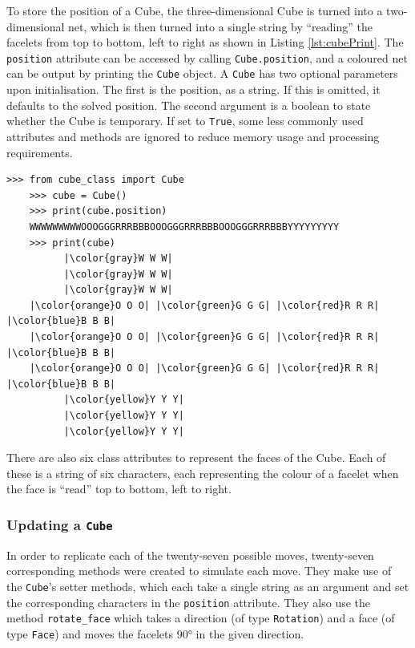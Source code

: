 \documentclass{report}
\begin{document}
    To store the position of a Cube, the three-dimensional Cube is turned into a two-dimensional net, which is then turned into a single string by \enquote{reading} the facelets from top to bottom, left to right as shown in Listing \ref{lst:cubePrint}. The \lstinline|position| attribute can be accessed by calling \lstinline|Cube.position|, and a coloured net can be output by printing the \lstinline|Cube| object. A \lstinline|Cube| has two optional parameters upon initialisation. The first is the position, as a string. If this is omitted, it defaults to the solved position. The second argument is a boolean to state whether the Cube is temporary. If set to \lstinline|True|, some less commonly used attributes and methods are ignored to reduce memory usage and processing requirements.
    
	\begin{lstlisting}[caption={The two different ways of accessing a Cube's position}, label={lst:cubePrint}]
    >>> from cube_class import Cube
    >>> cube = Cube()
    >>> print(cube.position)
    WWWWWWWWWOOOGGGRRRBBBOOOGGGRRRBBBOOOGGGRRRBBBYYYYYYYYY
    >>> print(cube)
          |\color{gray}W W W|
          |\color{gray}W W W|
          |\color{gray}W W W|
    |\color{orange}O O O| |\color{green}G G G| |\color{red}R R R| |\color{blue}B B B|
    |\color{orange}O O O| |\color{green}G G G| |\color{red}R R R| |\color{blue}B B B|
    |\color{orange}O O O| |\color{green}G G G| |\color{red}R R R| |\color{blue}B B B|
          |\color{yellow}Y Y Y|
          |\color{yellow}Y Y Y|
          |\color{yellow}Y Y Y|\end{lstlisting}
    
    There are also six class attributes to represent the faces of the Cube. Each of these is a string of six characters, each representing the colour of a facelet when the face is \enquote{read} top to bottom, left to right.
    
    \subsubsection{Updating a \lstinline|Cube|}
    
    In order to replicate each of the twenty-seven possible moves, twenty-seven corresponding methods were created to simulate each move. They make use of the \lstinline|Cube|'s setter methods, which each take a single string as an argument and set the corresponding characters in the \lstinline|position| attribute. They also use the method \lstinline|rotate_face| which takes a direction (of type \lstinline|Rotation|) and a face (of type \lstinline|Face|) and moves the facelets \ang{90} in the given direction.
    
\end{document}
